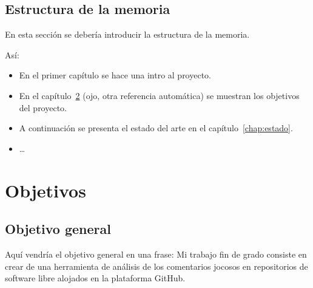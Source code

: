 \documentclass[a4paper, 12pt]{book}
\begin{document}
\section{Estructura de la memoria}
\label{sec:estructura}







En esta sección se debería introducir la estructura de la memoria. 

Así:


\begin{itemize}
  \item En el primer capítulo se hace una intro al proyecto.
  
  \item En el capítulo~\ref{chap:objetivos} (ojo, otra referencia automática) se muestran los objetivos del proyecto.
  
  \item A continuación se presenta el estado del arte en el capítulo~\ref{chap:estado}.
  
  \item \ldots
\end{itemize}






\cleardoublepage %
\chapter{Objetivos} %
\label{chap:objetivos} %

\section{Objetivo general} %
\label{sec:objetivo-general} %

Aquí vendría el objetivo general en una frase:
Mi trabajo fin de grado consiste en crear de una herramienta de análisis de los comentarios jocosos en repositorios de software libre alojados en la plataforma GitHub.
\end{document}
